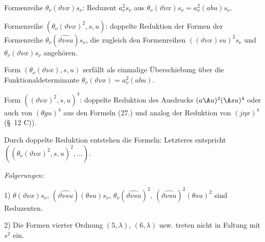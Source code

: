 Formenreihe $\theta_\nu(\vartheta \nu x)s_\nu$: Reduzent $a_\nu^2s_\nu$ aus $\theta_\nu(\vartheta \nu x)s_\nu=a_\nu^2(abu)s_\nu$.

Formenreihe $(\theta_\nu(\vartheta \nu x)^2,s,u)$: doppelte Reduktion der Formen der Formenreihe $\theta_\nu(\widehat{\vartheta \nu su})s_\nu$, die zugleich den Formenreihen $((\vartheta \nu x)su)^2s_\nu$ und $\theta_\nu(\vartheta \nu x)s_\nu$ angehören.

Form $(\theta_\nu(\vartheta \nu x),s,u)$ zerfällt als einmalige Überschiebung über die Funktionaldeterminante $\theta_\nu(\vartheta \nu x)=a_\nu^2(abu)$.

Form $((\vartheta \nu x)^2,s,u)^4$: doppelte Reduktion des Ausdrucks $(a\A u)^2(\A su)^4$ oder auch von $(\theta gu)^4$ aus den Formeln (27.) und analog der Reduktion von $(j\eta x)^4$ (\S\ 12 C)).

Durch doppelte Reduktion entstehen die Formeln:
Letzteres entspricht $((\theta_\nu(\vartheta \nu x)^2,s,u)^2,\ldots)$.

\noindent\emph{Folgerungen:}

1) $\theta(\vartheta \nu x)s_\nu$, $(\widehat{\vartheta \nu su})(\theta su)s_\nu$, $\theta_\nu(\widehat{\vartheta \nu su})^2$, $(\widehat{\vartheta \nu su})^2(\theta su)^2$ sind Reduzenten.

2) Die Formen vierter Ordnung $(5,\lambda)$, $(6,\lambda)$ usw. treten nicht in Faltung mit $s^2$ ein.

